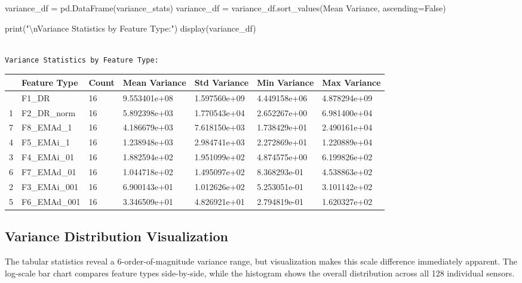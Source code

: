\documentclass[
  letterpaper,
  DIV=11,
  numbers=noendperiod]{scrartcl}
\newenvironment{Shaded}{\begin{snugshade}}{\end{snugshade}}
\newcommand{\BuiltInTok}[1]{\textcolor[rgb]{0.00,0.23,0.31}{#1}}
\newcommand{\CharTok}[1]{\textcolor[rgb]{0.13,0.47,0.30}{#1}}
\newcommand{\NormalTok}[1]{\textcolor[rgb]{0.00,0.23,0.31}{#1}}
\newcommand{\OperatorTok}[1]{\textcolor[rgb]{0.37,0.37,0.37}{#1}}
\newcommand{\StringTok}[1]{\textcolor[rgb]{0.13,0.47,0.30}{#1}}
\newcommand{\VariableTok}[1]{\textcolor[rgb]{0.07,0.07,0.07}{#1}}
\renewenvironment{Shaded}{%
  \begin{tcolorbox}[%
    enhanced,%
    colback=codebg,%
    colframe=codebg,%
    borderline west={3pt}{0pt}{sectionblue},%
    fontupper=\small\ttfamily,%
    boxrule=0pt,%
    arc=0pt,%
    boxsep=5pt,%
    left=2mm,%
    right=2mm,%
    top=2mm,%
    bottom=2mm%
  ]%
}{%
  \end{tcolorbox}%
}
\begin{document}
\begin{Shaded}
\begin{Highlighting}[]
\NormalTok{variance\_df }\OperatorTok{=}\NormalTok{ pd.DataFrame(variance\_stats)}
\NormalTok{variance\_df }\OperatorTok{=}\NormalTok{ variance\_df.sort\_values(}\StringTok{\textquotesingle{}Mean Variance\textquotesingle{}}\NormalTok{, ascending}\OperatorTok{=}\VariableTok{False}\NormalTok{)}

\BuiltInTok{print}\NormalTok{(}\StringTok{"}\CharTok{\textbackslash{}n}\StringTok{Variance Statistics by Feature Type:"}\NormalTok{)}
\NormalTok{display(variance\_df)}
\end{Highlighting}
\end{Shaded}

\begin{verbatim}

Variance Statistics by Feature Type:
\end{verbatim}

\begin{longtable}[]{@{}lllllll@{}}
\toprule\noalign{}
& Feature Type & Count & Mean Variance & Std Variance & Min Variance &
Max Variance \\
\midrule\noalign{}
\endhead
\bottomrule\noalign{}
\endlastfoot
0 & F1\_DR & 16 & 9.553401e+08 & 1.597560e+09 & 4.449158e+06 &
4.878294e+09 \\
1 & F2\_DR\_norm & 16 & 5.892398e+03 & 1.770543e+04 & 2.652267e+00 &
6.981400e+04 \\
7 & F8\_EMAd\_1 & 16 & 4.186679e+03 & 7.618150e+03 & 1.738429e+01 &
2.490161e+04 \\
4 & F5\_EMAi\_1 & 16 & 1.238948e+03 & 2.984741e+03 & 2.272869e+01 &
1.220889e+04 \\
3 & F4\_EMAi\_01 & 16 & 1.882594e+02 & 1.951099e+02 & 4.874575e+00 &
6.199826e+02 \\
6 & F7\_EMAd\_01 & 16 & 1.044718e+02 & 1.495097e+02 & 8.368293e-01 &
4.538863e+02 \\
2 & F3\_EMAi\_001 & 16 & 6.900143e+01 & 1.012626e+02 & 5.253051e-01 &
3.101142e+02 \\
5 & F6\_EMAd\_001 & 16 & 3.346509e+01 & 4.826921e+01 & 2.794819e-01 &
1.620327e+02 \\
\end{longtable}

\subsection{Variance Distribution
Visualization}\label{variance-distribution-visualization}

The tabular statistics reveal a 6-order-of-magnitude variance range, but
visualization makes this scale difference immediately apparent. The
log-scale bar chart compares feature types side-by-side, while the
histogram shows the overall distribution across all 128 individual
sensors.
\end{document}
